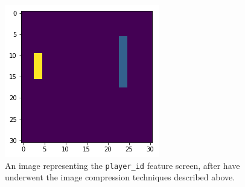 \documentclass{amsart}
\theoremstyle{definition}
\begin{document}
\begin{figure}[h!]
    \includegraphics[width=1.0\linewidth]{course}
    \caption{An image representing the {\tt player\_id} feature screen, after have underwent the image compression techniques described above.}
\end{figure}

\end{document}
